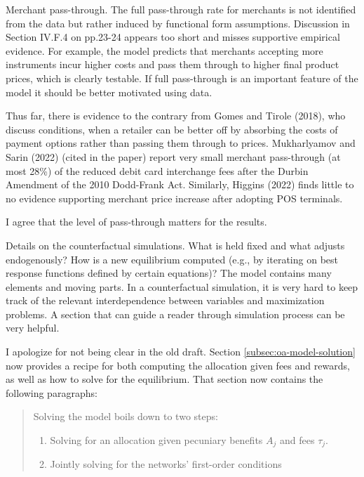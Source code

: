 \documentclass[main.tex]{subfiles}
\begin{document}
\begin{refsection}
\begin{refcomment}
Merchant pass-through.
The full pass-through rate for merchants is not identified from the data but rather induced by functional form assumptions.
Discussion in Section IV.F.4 on pp.23-24 appears too short and misses supportive empirical evidence.
For example, the model predicts that merchants accepting more instruments incur higher costs and pass them through to higher final product prices, which is clearly testable.
If full pass-through is an important feature of the model it should be better motivated using data.

Thus far, there is evidence to the contrary from Gomes and Tirole (2018), who discuss conditions, when a retailer can be better off by absorbing the costs of payment options rather than passing them through to prices.
Mukharlyamov and Sarin (2022) (cited in the paper) report very small merchant pass-through (at most 28\%) of the reduced debit card interchange fees after the Durbin Amendment of the 2010 Dodd-Frank Act.
Similarly, Higgins (2022) finds little to no evidence supporting merchant price increase after adopting POS terminals.
\end{refcomment}

I agree that the level of pass-through matters for the results.
\replypassthrough

\begin{refcomment}
Details on the counterfactual simulations.
What is held fixed and what adjusts endogenously?
How is a new equilibrium computed (e.g., by iterating on best response functions defined by certain equations)?
The model contains many elements and moving parts.
In a counterfactual simulation, it is very hard to keep track of the relevant interdependence between variables and maximization problems.
A section that can guide a reader through simulation process can be very helpful.
\end{refcomment}

I apologize for not being clear in the old draft.
Section \ref{subsec:oa-model-solution} now provides a recipe for both computing the allocation given fees and rewards, as well as how to solve for the equilibrium.
That section now contains the following paragraphs:

\begin{quotation}
    Solving the model boils down to two steps:
    \begin{enumerate}
        \item Solving for an allocation given pecuniary benefits $A_j$ and fees $\tau_j$.
        \item Jointly solving for the networks' first-order conditions
    \end{enumerate}


\end{quotation}
\end{refsection}
\end{document}
